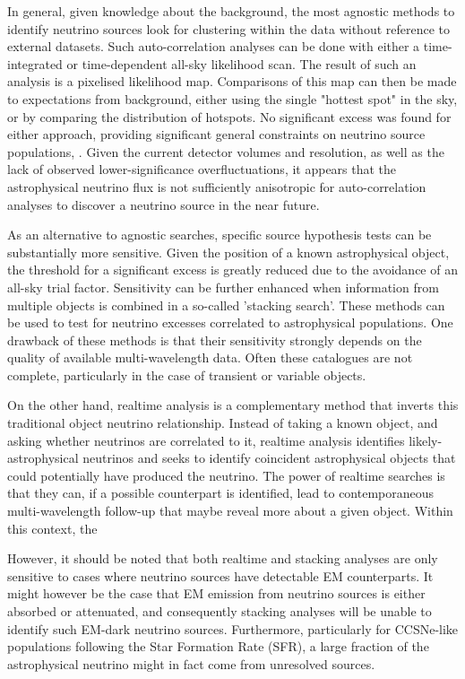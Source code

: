 In general, given knowledge about the background, the most agnostic methods to identify neutrino sources look for clustering within the data without reference to external datasets. Such auto-correlation analyses can be done with either a time-integrated or time-dependent all-sky likelihood scan. The result of such an analysis is a pixelised likelihood map. Comparisons of this map can then be made to expectations from background, either using the single "hottest spot" in the sky, or by comparing the distribution of hotspots. No significant excess was found for either approach, providing significant general constraints on neutrino source populations, . Given the current detector volumes and resolution, as well as the lack of observed lower-significance overfluctuations, it appears that the astrophysical neutrino flux is not sufficiently anisotropic for auto-correlation analyses to discover a neutrino source in the near future.

As an alternative to agnostic searches, specific source hypothesis tests can be substantially more sensitive. Given the position of a known astrophysical object, the threshold for a significant excess is greatly reduced due to the avoidance of an all-sky trial factor. Sensitivity can be further enhanced when information from multiple objects is combined in a so-called 'stacking search'. These methods can be used to test for neutrino excesses correlated to astrophysical populations. One drawback of these methods is that their sensitivity strongly depends on the quality of available multi-wavelength data. Often these catalogues are not complete, particularly in the case of transient or variable objects. 

On the other hand, realtime analysis is a complementary method that inverts this traditional object neutrino relationship. Instead of taking a known object, and asking whether neutrinos are correlated to it, realtime analysis identifies likely-astrophysical neutrinos and seeks to identify coincident astrophysical objects that could potentially have produced the neutrino. The power of realtime searches is that they can, if a possible counterpart is identified, lead to contemporaneous multi-wavelength follow-up that maybe reveal more about a given object. Within this context, the 

However, it should be noted that both realtime and stacking analyses are only sensitive to cases where neutrino sources have detectable EM counterparts. It might however be the case that EM emission from neutrino sources is either absorbed or attenuated, and consequently stacking analyses will be unable to identify such EM-dark neutrino sources. Furthermore, particularly for CCSNe-like populations following the Star Formation Rate (SFR), a large fraction of the astrophysical neutrino might in fact come from unresolved sources.

